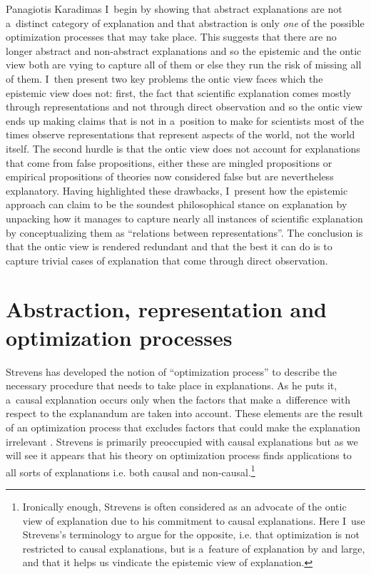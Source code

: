 \begin{artengenv}{Panagiotis Karadimas}
I~begin by showing that abstract explanations are not a~distinct category of explanation and that abstraction is only \textit{one} of the possible optimization processes that may take place. This suggests that there are no longer abstract and non-abstract explanations and so the epistemic and the ontic view both are vying to capture all of them or else they run the risk of missing all of them. I~then present two key problems the ontic view faces which the epistemic view does not: first, the fact that scientific explanation comes mostly through representations and not through direct observation and so the ontic view ends up making claims that is not in a~position to make for scientists most of the times observe representations that represent aspects of the world, not the world itself. The second hurdle is that the ontic view does not account for explanations that come from false propositions, either these are mingled propositions or empirical propositions of theories now considered false but are nevertheless explanatory. Having highlighted these drawbacks, I~present how the epistemic approach can claim to be the soundest philosophical stance on explanation by unpacking how it manages to capture nearly all instances of scientific explanation by conceptualizing them as ``relations between representations''. The conclusion is that the ontic view is rendered redundant and that the best it can do is to capture trivial cases of explanation that come through direct observation.

\section{Abstraction, representation and optimization processes}
Strevens has developed the notion of ``optimization process'' to describe the necessary procedure that needs to take place in explanations. As he puts it, a~causal explanation occurs only when the factors that make a~difference with respect to the explanandum are taken into account. These elements are the result of an optimization process that excludes factors that could make the explanation irrelevant
\parencite[][]{strevens_depth_2011}. %
 Strevens is primarily preoccupied with causal explanations but as we will see it appears that his theory on optimization process finds applications to all sorts of explanations i.e. both causal and non-causal.\footnote{Ironically enough, Strevens is often considered as an advocate of the ontic view of explanation due to his commitment to causal explanations. Here I~use Strevens's terminology to argue for the opposite, i.e. that optimization is not restricted to causal explanations, but is a~feature of explanation by and large, and that it helps us vindicate the epistemic view of explanation.}


\end{artengenv}
